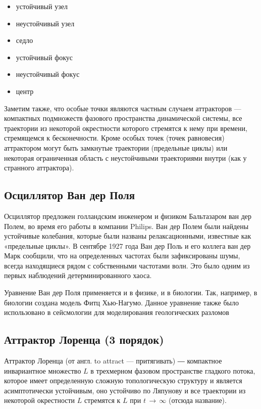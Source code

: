 \begin{itemize}
	\item устойчивый узел
	\item неустойчивый узел
	\item седло
	\item устойчивый фокус
	\item неустойчивый фокус
	\item центр
\end{itemize}

Заметим также, что особые точки являются частным случаем аттракторов — компактных подмножеств фазового пространства динамической системы, 
все траектории из некоторой окрестности которого стремятся к нему при времени, стремящемся к бесконечности. 
Кроме особых точек (точек равновесия) аттрактором могут быть замкнутые траектории (предельные циклы) или некоторая ограниченная область с неустойчивыми траекториями внутри (как у странного аттрактора).
\subsection{Осциллятор Ван дер Поля}
Осциллятор предложен голландским инженером и физиком Бальтазаром ван дер Полем, во время его работы в компании Philips. 
Ван дер Полем были найдены устойчивые колебания, которые были названы релаксационными, известные как «предельные циклы». 
В сентябре 1927 года Ван дер Поль и его коллега ван дер Марк сообщили, что на определенных частотах были зафиксированы шумы, всегда находящиеся рядом с собственными частотами волн. 
Это было одним из первых наблюдений детерминированного хаоса.

Уравнение Ван дер Поля применяется и в физике, и в биологии. Так, например, в биологии создана модель Фитц Хью-Нагумо. 
Данное уравнение также было использовано в сейсмологии для моделирования геологических разломов

\subsection{Аттрактор Лоренца (3 порядок)}

Аттрактор Лоренца (от англ. to attract — притягивать) ― компактное инвариантное множество $L$ в трехмерном фазовом пространстве гладкого потока, 
которое имеет определенную сложную топологическую структуру и является асимптотически устойчивым, 
оно устойчиво по Ляпунову и все траектории из некоторой окрестности $L$ стремятся к $L$ при $t\,\to\,\infty$ (отсюда название).

